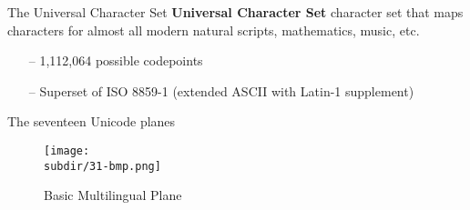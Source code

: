 \documentclass[../index.tex]{subfiles}
\begin{document}
\renewcommand{\currenttitle}{The Universal Character Set}
\begin{frame}{\currenttitle}
%
%
%
%
  \textbf{Universal Character Set} \textendash{}
      character set that maps characters for almost all modern natural scripts,
      mathematics, music, etc. \\

  \begin{itemize}
    \item[--] 1,112,064 possible codepoints
    \item[--] Superset of ISO 8859-1 (extended ASCII with Latin-1 supplement)
  \end{itemize}
\end{frame}

\renewcommand{\currenttitle}{The seventeen Unicode planes}
\begin{frame}{\currenttitle}
%
%
%
  \vspace*{1em}
  \begin{figure}
    \centering
    \texttt{[image: \\subdir/31-bmp.png]}
    \caption{Basic Multilingual Plane}
  \end{figure}
\end{frame}
\end{document}
